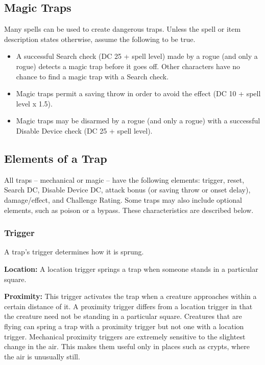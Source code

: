 \subsection{Magic Traps}

Many spells can be used to create dangerous traps. Unless the spell or item description 
states otherwise, assume the following to be true.

\begin{itemize}
\item A successful Search check (DC 25 + spell level) made by a rogue (and only a rogue) 
detects a magic trap before it goes off. Other characters have no chance to find 
a magic trap with a Search check.
\item Magic traps permit a saving throw in order to avoid the effect (DC 10 + spell level x 1.5).
\item Magic traps may be disarmed by a rogue (and only a rogue) with a successful Disable 
Device check (DC 25 + spell level).
\end{itemize}

\subsection{Elements of a Trap}

All traps -- mechanical or magic -- have the following elements: trigger, reset, 
Search DC, Disable Device DC, attack bonus (or saving throw or onset delay), damage/effect, 
and Challenge Rating. Some traps may also include optional elements, such as poison 
or a bypass. These characteristics are described below.

\subsubsection{Trigger}

A trap's trigger determines how it is sprung.

\textbf{Location:} A location trigger springs a trap when someone stands in a particular 
square.

\textbf{Proximity:} This trigger activates the trap when a creature approaches 
within a certain distance of it. A proximity trigger differs from a location trigger 
in that the creature need not be standing in a particular square. Creatures that 
are flying can spring a trap with a proximity trigger but not one with a location 
trigger. Mechanical proximity triggers are extremely sensitive to the slightest 
change in the air. This makes them useful only in places such as crypts, where 
the air is unusually still.

